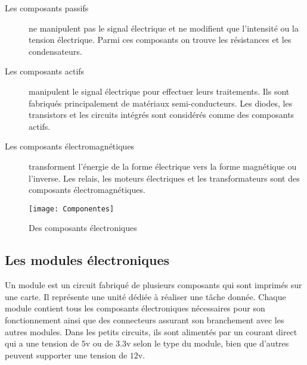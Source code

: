 \begin{description}
  \item[Les composants passifs] ne manipulent pas le signal électrique
  et ne modifient que l'intensité ou la tension électrique. Parmi ces composants
  on trouve les résistances et les condensateurs.
  \item[Les composants actifs] manipulent le signal électrique pour
  effectuer leurs traitements. Ils sont fabriqués principalement de matériaux
  semi-conducteurs. Les diodes, les transistors et les circuits intégrés sont
  considérés comme des composants actifs.
  \item[Les composants électromagnétiques] transforment l'énergie de la
  forme électrique vers la forme magnétique ou l'inverse. Les relais, les
  moteurs électriques et les transformateurs sont des composants électromagnétiques.
\end{description}

\begin{figure}[H]
\texttt{[image: Componentes]}
\caption{Des composants électroniques}{\cite{commonsComponents}}
\end{figure}

\subsection{Les modules électroniques}
Un module est un circuit fabriqué de plusieurs composants qui sont imprimés sur
une carte. Il représente une unité dédiée à réaliser une tâche donnée. Chaque
module contient tous les composants électroniques nécessaires pour son
fonctionnement ainsi que des connecteurs assurant son branchement avec les
autres modules. Dans les petits circuits, ils sont alimentés par un courant
direct qui a une tension de $5$v ou de $3.3$v selon le type du module, bien
que d'autres peuvent supporter une tension de $12$v.

